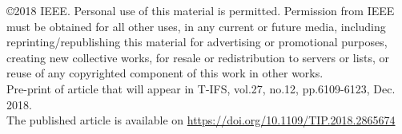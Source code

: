 \documentclass[journal,onecolumn,12pt]{IEEEtran}
\begin{document}
    
\noindent \copyright 2018 IEEE. Personal use of this material is permitted. Permission from IEEE must be obtained for all other uses, in any current or future media, including reprinting/republishing this material for advertising or promotional purposes, creating new collective works, for resale or redistribution to servers or lists, or reuse of any copyrighted component of this work in other works.
\\

\noindent Pre-print of article that will appear in T-IFS, vol.27, no.12, pp.6109-6123, Dec. 2018.
\\

\noindent The published article is available on \url{https://doi.org/10.1109/TIP.2018.2865674}


    
\end{document}

